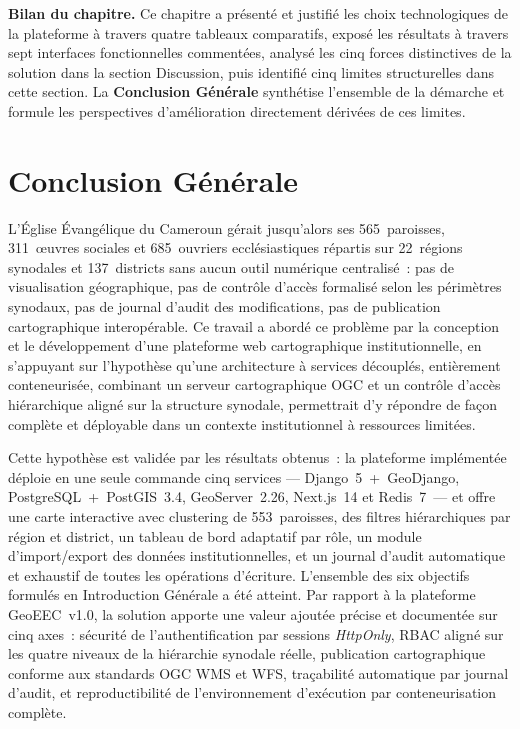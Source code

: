 \medskip
\noindent\textbf{Bilan du chapitre.}
Ce chapitre a présenté et justifié les choix technologiques de la
plateforme à travers quatre tableaux comparatifs, exposé les résultats
à travers sept interfaces fonctionnelles commentées, analysé les cinq
forces distinctives de la solution dans la section Discussion, puis
identifié cinq limites structurelles dans cette section. La
\textbf{Conclusion Générale} synthétise l'ensemble de la démarche
et formule les perspectives d'amélioration directement dérivées
de ces limites.

\clearpage

\chapter*{Conclusion Générale}

\noindent
L'Église Évangélique du Cameroun gérait jusqu'alors ses 565~paroisses,
311~œuvres sociales et 685~ouvriers ecclésiastiques répartis sur
22~régions synodales et 137~districts sans aucun outil numérique
centralisé~: pas de visualisation géographique, pas de contrôle d'accès
formalisé selon les périmètres synodaux, pas de journal d'audit des
modifications, pas de publication cartographique interopérable. Ce travail
a abordé ce problème par la conception et le développement d'une
plateforme web cartographique institutionnelle, en s'appuyant sur
l'hypothèse qu'une architecture à services découplés, entièrement
conteneurisée, combinant un serveur cartographique OGC et un contrôle
d'accès hiérarchique aligné sur la structure synodale, permettrait d'y
répondre de façon complète et déployable dans un contexte institutionnel
à ressources limitées.

Cette hypothèse est validée par les résultats obtenus~: la plateforme
implémentée déploie en une seule commande cinq services
--- Django~5~+~GeoDjango, PostgreSQL~+~PostGIS~3.4, GeoServer~2.26,
Next.js~14 et Redis~7~--- et offre une carte interactive avec clustering
de 553~paroisses, des filtres hiérarchiques par région et district, un
tableau de bord adaptatif par rôle, un module d'import/export des données
institutionnelles, et un journal d'audit automatique et exhaustif de toutes
les opérations d'écriture. L'ensemble des six objectifs formulés en
Introduction Générale a été atteint. Par rapport à la plateforme
GeoEEC~v1.0, la solution apporte une valeur ajoutée précise et documentée
sur cinq axes~: sécurité de l'authentification par sessions \textit{HttpOnly},
RBAC aligné sur les quatre niveaux de la hiérarchie synodale réelle,
publication cartographique conforme aux standards OGC WMS et WFS, traçabilité
automatique par journal d'audit, et reproductibilité de l'environnement
d'exécution par conteneurisation complète.

